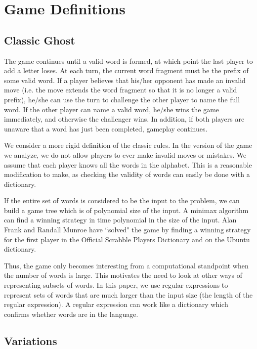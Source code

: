 \documentclass[runningheads,a4paper]{llncs}
\begin{document}
\section{Game Definitions}
\label{Game Definitions}

\subsection{Classic Ghost}

The game continues until a valid word is formed, at which point the last player to add a letter loses. At each turn, the current word fragment must be the prefix of some valid word. If a player believes that his/her opponent has made an invalid move (i.e. the move extends the word fragment so that it is no longer a valid prefix), he/she can use the turn to challenge the other player to name the full word. If the other player can name a valid word, he/she wins the game immediately, and otherwise the challenger wins. In addition, if both players are unaware that a word has just been completed, gameplay continues.

	We consider a more rigid definition of the classic rules. In the version of the game we analyze, we do not allow players to ever make invalid moves or mistakes. We assume that each player knows all the words in the alphabet. This is a reasonable modification to make, as checking the validity of words can easily be done with a dictionary.

	If the entire set of words is considered to be the input to the problem, we can build a game tree which is of polynomial size of the input. A minimax algorithm can find a winning strategy in time polynomial in the size of the input. Alan Frank and Randall Munroe have ``solved" the game by finding a winning strategy for the first player in the Official Scrabble Players Dictionary and on the Ubuntu dictionary. 

	Thus, the game only becomes interesting from a computational standpoint when the number of words is large. This motivates the need to look at other ways of representing subsets of words. In this paper, we use regular expressions to represent sets of words that are much larger than the input size (the length of the regular expression). A regular expression can work like a dictionary which confirms whether words are in the language.

\subsection{Variations}
\end{document}
